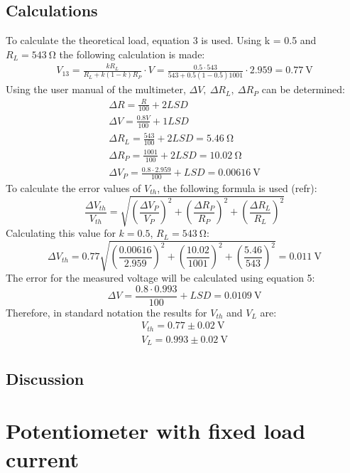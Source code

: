 \documentclass[a4paper]{article}
\newcommand{\unit}[1]{~\mathrm{#1}}
\begin{document}
\subsection{Calculations}
To calculate the theoretical load, equation 3 is used. Using k = 0.5 and $R_L =
543\unit{\Omega}$ the following calculation is made:
\begin{gather*}
    V_{13} = \frac{kR_L}{R_L + k(1-k) R_P} \cdot V = \frac{0.5 \cdot 543}{543 + 0.5(1-0.5)1001} \cdot 2.959 = 0.77\unit{V}
\end{gather*}
Using the user manual of the multimeter, $\Delta V, ~\Delta R_L, ~\Delta R_P$ can
be determined:
\begin{gather}
    \Delta R = \frac{R}{100} + 2LSD\\
    \Delta V = \frac{0.8 V}{100} + 1LSD\\
    \Delta R_L = \frac{543}{100} + 2LSD = 5.46\unit{\Omega} \nonumber \\
    \Delta R_P = \frac{1001}{100} + 2LSD = 10.02\unit{\Omega} \nonumber \\
    \Delta V_P = \frac{0.8 \cdot 2.959}{100} + LSD = 0.00616\unit{V} \nonumber
\end{gather} 
To calculate the error values of $V_{th}$, the following formula is used (refr):
\begin{equation}
    \frac{\Delta V_{th}}{V_{th}} = \sqrt{\left( \frac{\Delta V_P}{V_P}\right) ^2 + \left( \frac{\Delta R_P}{R_P} \right) ^ 2 + \left( \frac{\Delta R_L}{R_L} \right) ^2}
\end{equation}
Calculating this value for $k = 0.5$, $R_L = 543\unit{\Omega}$:
\[ \Delta V_{th} = 0.77 \sqrt{\left( \frac{0.00616}{2.959} \right) ^ 2 + \left(
\frac{10.02}{1001} \right) ^2 + \left(\frac{5.46}{543} \right) ^2 } = 0.011
\unit{V} \]
The error for the measured voltage will be calculated using equation 5:
\[ \Delta V = \frac{0.8 \cdot 0.993}{100} + LSD = 0.0109\unit{V} \]
Therefore, in standard notation the results for $V_{th}$ and $V_L$ are:
\begin{gather*}
    V_{th} = 0.77 \pm 0.02 \unit{V}\\
    V_L = 0.993 \pm 0.02 \unit{V}
\end{gather*}

\subsection{Discussion}

\section{Potentiometer with fixed load current}
\end{document}
